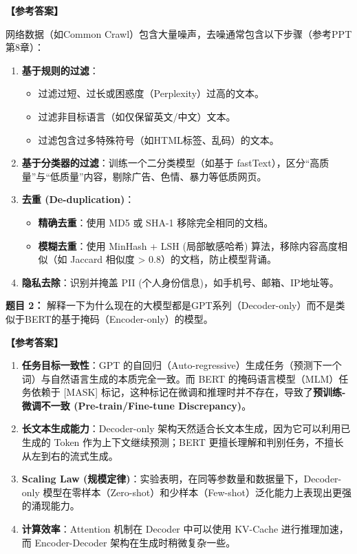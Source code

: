 \documentclass[a4paper,11pt]{article}
\newenvironment{question}[1]
    {\vspace{0.5cm}\noindent\textbf{题目 #1：}}
    {\vspace{0.2cm}}
\newenvironment{answer}
    {\noindent\textbf{【参考答案】}\par\small\color{blue}}
    {\par\vspace{0.5cm}\normalcolor}
\begin{document}
\begin{answer}
网络数据（如Common Crawl）包含大量噪声，去噪通常包含以下步骤（参考PPT第8章）：
\begin{enumerate}
    \item \textbf{基于规则的过滤}：
    \begin{itemize}
        \item 过滤过短、过长或困惑度（Perplexity）过高的文本。
        \item 过滤非目标语言（如仅保留英文/中文）文本。
        \item 过滤包含过多特殊符号（如HTML标签、乱码）的文本。
    \end{itemize}
    \item \textbf{基于分类器的过滤}：训练一个二分类模型（如基于 fastText），区分“高质量”与“低质量”内容，剔除广告、色情、暴力等低质网页。
    \item \textbf{去重 (De-duplication)}：
    \begin{itemize}
        \item \textbf{精确去重}：使用 MD5 或 SHA-1 移除完全相同的文档。
        \item \textbf{模糊去重}：使用 MinHash + LSH (局部敏感哈希) 算法，移除内容高度相似（如 Jaccard 相似度 > 0.8）的文档，防止模型背诵。
    \end{itemize}
    \item \textbf{隐私去除}：识别并掩盖 PII (个人身份信息)，如手机号、邮箱、IP地址等。
\end{enumerate}
\end{answer}

\begin{question}{2}
解释一下为什么现在的大模型都是GPT系列（Decoder-only）而不是类似于BERT的基于掩码（Encoder-only）的模型。
\end{question}

\begin{answer}
\begin{enumerate}
    \item \textbf{任务目标一致性}：GPT 的自回归（Auto-regressive）生成任务（预测下一个词）与自然语言生成的本质完全一致。而 BERT 的掩码语言模型（MLM）任务依赖于 [MASK] 标记，这种标记在微调和推理时并不存在，导致了\textbf{预训练-微调不一致 (Pre-train/Fine-tune Discrepancy)}。
    \item \textbf{长文本生成能力}：Decoder-only 架构天然适合长文本生成，因为它可以利用已生成的 Token 作为上下文继续预测；BERT 更擅长理解和判别任务，不擅长从左到右的流式生成。
    \item \textbf{Scaling Law (规模定律)}：实验表明，在同等参数量和数据量下，Decoder-only 模型在零样本（Zero-shot）和少样本（Few-shot）泛化能力上表现出更强的涌现能力。
    \item \textbf{计算效率}：Attention 机制在 Decoder 中可以使用 KV-Cache 进行推理加速，而 Encoder-Decoder 架构在生成时稍微复杂一些。
\end{enumerate}
\end{answer}
\end{document}
